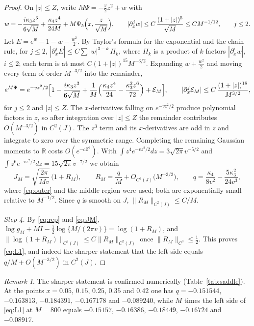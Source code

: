 \documentclass[11pt,a4paper]{article}
\theoremstyle{remark}
\newtheorem{remark}{Remark}
\newcommand{\R}{\mathbb R}
\numberwithin{equation}{section}
\begin{document}
\begin{proof}
On $|z|\le Z$, write $M\Psi=-\frac v2z^2+w$ with
\begin{equation}\label{eq:w}
 w=-\frac{i\kappa_3z^3}{6\sqrt M}+\frac{\kappa_4z^4}{24M}+M\Psi_5\Bigl(x,\frac z{\sqrt M}\Bigr),
 \qquad |\partial_x^jw|\le C\,\frac{(1+|z|)^5}{\sqrt M}\le CM^{-1/12},\qquad j\le2 .
\end{equation}
Let $E=e^w-1-w-\frac{w^2}2$. By Taylor's formula for the exponential and the chain rule,
for $j\le2$, $|\partial_x^jE|\le C\sum|w|^{3-k}\,\Pi_k$, where $\Pi_k$ is a product of $k$
factors $|\partial_x^{i}w|$, $i\le2$; each term is at most $C(1+|z|)^{15}M^{-3/2}$. Expanding
$w+\frac{w^2}2$ and moving every term of order $M^{-3/2}$ into the remainder,
\begin{equation}\label{eq:exp}
 e^{M\Psi}=e^{-vz^2/2}\Bigl[1-\frac{i\kappa_3z^3}{6\sqrt M}
 +\frac1M\Bigl(\frac{\kappa_4z^4}{24}-\frac{\kappa_3^2z^6}{72}\Bigr)+\mathcal E_M\Bigr],
 \qquad |\partial_x^j\mathcal E_M|\le C\,\frac{(1+|z|)^{18}}{M^{3/2}} ,
\end{equation}
for $j\le2$ and $|z|\le Z$. The $x$-derivatives falling on $e^{-vz^2/2}$ produce polynomial
factors in $z$, so after integration over $|z|\le Z$ the remainder contributes
$O(M^{-3/2})$ in $C^2(J)$. The $z^3$ term and its $x$-derivatives are odd in $z$ and
integrate to zero over the symmetric range. Completing the remaining Gaussian moments to
$\R$ costs $O(e^{-cZ^2})$. With $\int z^4e^{-vz^2/2}dz=3\sqrt{2\pi}v^{-5/2}$ and
$\int z^6e^{-vz^2/2}dz=15\sqrt{2\pi}v^{-7/2}$ we obtain
\begin{equation}\label{eq:JM}
 J_M=\sqrt{\frac{2\pi}{Mv}}\,\bigl(1+R_M\bigr),\qquad
 R_M=\frac{q}{M}+O_{C^2(J)}\bigl(M^{-3/2}\bigr),\qquad
 q=\frac{\kappa_4}{8v^2}-\frac{5\kappa_3^2}{24v^3},
\end{equation}
where \eqref{eq:outer} and the middle region were used; both are exponentially small
relative to $M^{-1/2}$. Since $q$ is smooth on $J$, $\|R_M\|_{C^2(J)}\le C/M$.

\emph{Step 4.} By \eqref{eq:rep} and \eqref{eq:JM},
$\log g_M+MI-\frac12\log\{M/(2\pi v)\}=\log(1+R_M)$, and
$\|\log(1+R_M)\|_{C^2(J)}\le C\|R_M\|_{C^2(J)}$ once $\|R_M\|_{C^0}\le\frac12$. This
proves \eqref{eq:L1}, and indeed the sharper statement that the left side equals
$q/M+O(M^{-3/2})$ in $C^2(J)$.
\end{proof}

\begin{remark}
The sharper statement is confirmed numerically (Table~\ref{tab:saddle}). At the points
$x=0.05$, $0.15$, $0.25$, $0.35$ and $0.42$ one has $q=-0.151544$, $-0.163813$,
$-0.184391$, $-0.167178$ and $-0.089240$, while $M$ times the left side of \eqref{eq:L1}
at $M=800$ equals $-0.15157$, $-0.16386$, $-0.18449$, $-0.16724$ and $-0.08917$.
\end{remark}
\end{document}
